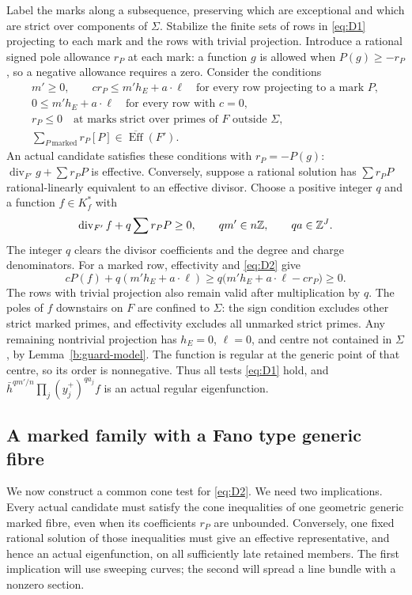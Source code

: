 Label the marks along a subsequence, preserving which are exceptional and
which are strict over components of \(\Sigma\). Stabilize the finite sets
of rows in \eqref{eq:D1} projecting to each mark and the rows with trivial
projection. Introduce a rational signed pole allowance \(r_P\) at each
mark: a function \(g\) is allowed when \(P(g)\ge-r_P\), so a
negative allowance requires a zero. Consider the conditions
\begin{equation}\label{eq:D2}
\begin{gathered}
 m'\geq0,\qquad
 cr_P\leq m'h_E+a\cdot\ell
       \quad\text{for every row projecting to a mark }P,\\
 0\leq m'h_E+a\cdot\ell
       \quad\text{for every row with }c=0,\\
 r_P\leq0
       \quad\text{at marks strict over primes of }F\text{ outside }\Sigma,\\
 \sum_{P\ \mathrm{marked}}r_P[P]\in
       \overline{\operatorname{Eff}}(F').
\end{gathered}
\end{equation}
An actual candidate satisfies these conditions with \(r_P=-P(g)\):
\(\operatorname{div}_{F'}g+\sum r_PP\) is effective. Conversely, suppose
a rational solution has \(\sum r_PP\) rational-linearly equivalent to an
effective divisor. Choose a positive integer \(q\) and a function
\(f\in K_f^*\) with
\[
 \operatorname{div}_{F'}f+q\sum r_PP\ge0,
 \qquad qm'\in n\mathbb Z,\qquad qa\in\mathbb Z^J.
\]
The integer \(q\) clears the divisor coefficients and the degree and
charge denominators. For a marked row, effectivity and \eqref{eq:D2}
give
\[
 cP(f)+q(m'h_E+a\cdot\ell)
 \ge q\bigl(m'h_E+a\cdot\ell-cr_P\bigr)\ge0.
\]
The rows with trivial projection also remain valid after multiplication
by \(q\). The poles of \(f\) downstairs on \(F\) are confined to
\(\Sigma\): the sign condition excludes other strict marked primes,
and effectivity excludes all unmarked strict primes. Any remaining
nontrivial projection has \(h_E=0\), \(\ell=0\), and centre not
contained in \(\Sigma\), by Lemma~\ref{b:guard-model}. The function
is regular at the generic point of that centre, so its order is
nonnegative. Thus all tests \eqref{eq:D1} hold, and
\(\bar h^{qm'/n}\prod_j(y_j^+)^{qa_j}f\) is an actual regular
eigenfunction.

\subsection{A marked family with a Fano type generic fibre}
We now construct a common cone test for \eqref{eq:D2}. We need two
implications. Every actual candidate must satisfy the cone inequalities
of one geometric generic marked fibre, even when its coefficients
\(r_P\) are unbounded. Conversely, one fixed rational solution of
those inequalities must give an effective representative, and hence
an actual eigenfunction, on all sufficiently late retained members.
The first implication will use sweeping curves; the second will
spread a line bundle with a nonzero section.

